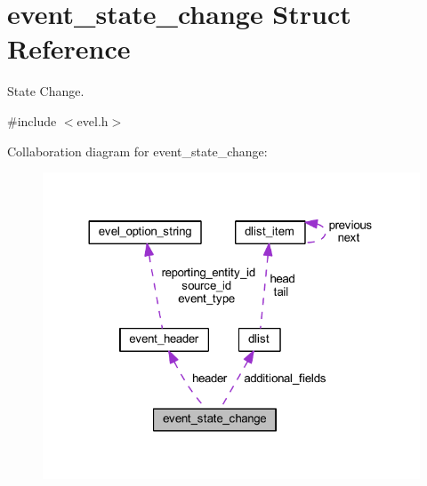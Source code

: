 \hypertarget{structevent__state__change}{}\section{event\+\_\+state\+\_\+change Struct Reference}
\label{structevent__state__change}


State Change.  




{\ttfamily \#include $<$evel.\+h$>$}



Collaboration diagram for event\+\_\+state\+\_\+change\+:
\nopagebreak
\begin{figure}[H]
\begin{center}
\leavevmode
\includegraphics[width=320pt]{structevent__state__change__coll__graph}
\end{center}
\end{figure}
